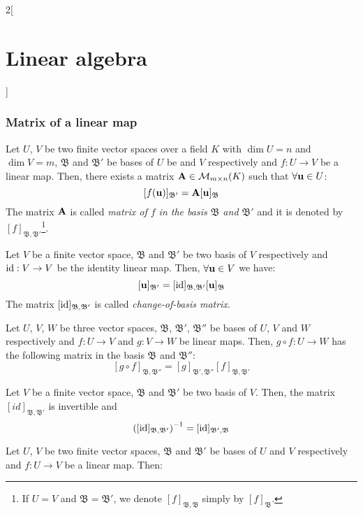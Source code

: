 \documentclass[../../../main.tex]{subfiles}
\begin{document}
\begin{multicols}{2}[\section{Linear algebra}]
  \subsubsection*{Matrix of a linear map}
  \begin{prop}
    Let $U$, $V$ be two finite vector spaces over a field $K$ with $\dim U=n$ and $\dim V=m$, $\mathfrak{B}$ and $\mathfrak{B}'$ be bases of $U$ be and $V$ respectively and $f:U\rightarrow V$ be a linear map. Then, there exists a matrix $\vb{A}\in\mathcal{M}_{m\times n}(K)$ such that $\forall\vb{u}\in U$: $$[f(\vb{u})]_{\mathfrak{B}'}=\vb{A}[\vb{u}]_\mathfrak{B}$$
    The matrix $\vb{A}$ is called \textit{matrix of $f$ in the basis $\mathfrak{B}$ and $\mathfrak{B}'$} and it is denoted by $[f]_{\mathfrak{B},\mathfrak{B}'}$\footnote{If $U=V$ and $\mathfrak{B}=\mathfrak{B}'$, we denote $[f]_{\mathfrak{B},\mathfrak{B}}$ simply by $[f]_{\mathfrak{B}}$.}.
  \end{prop}
  \begin{corollary}
    Let $V$ be a finite vector space, $\mathfrak{B}$ and $\mathfrak{B}'$ be two basis of $V$ respectively and $\mathrm{id}:V\rightarrow V$ be the identity linear map. Then, $\forall\vb{u}\in V$ we have: $$[\vb{u}]_{\mathfrak{B}'}=[\mathrm{id}]_{\mathfrak{B},\mathfrak{B}'}[\vb{u}]_\mathfrak{B}$$ The matrix $[\mathrm{id}]_{\mathfrak{B},\mathfrak{B}'}$ is called \textit{change-of-basis matrix}.
  \end{corollary}
  \begin{prop}
    Let $U$, $V$, $W$ be three vector spaces, $\mathfrak{B}$, $\mathfrak{B}'$, $\mathfrak{B}''$ be bases of $U$, $V$ and $W$ respectively and $f:U\rightarrow V$ and $g:V\rightarrow W$ be linear maps. Then, $g\circ f:U\rightarrow W$ has the following matrix in the basis $\mathfrak{B}$ and $\mathfrak{B}''$: $$[g\circ f]_{\mathfrak{B},\mathfrak{B}''}=[g]_{\mathfrak{B}',\mathfrak{B}''}[f]_{\mathfrak{B},\mathfrak{B}'}$$
  \end{prop}
  \begin{corollary}
    Let $V$ be a finite vector space, $\mathfrak{B}$ and $\mathfrak{B}'$ be two basis of $V$. Then, the matrix $[id]_{\mathfrak{B},\mathfrak{B}'}$ is invertible and $${\left([\mathrm{id}]_{\mathfrak{B},\mathfrak{B}'}\right)}^{-1}=[\mathrm{id}]_{\mathfrak{B}',\mathfrak{B}}$$
  \end{corollary}
  \begin{corollary}
    Let $U$, $V$ be two finite vector spaces, $\mathfrak{B}$ and $\mathfrak{B}'$ be bases of $U$ and $V$ respectively and $f:U\rightarrow V$ be a linear map. Then:

\end{corollary}
\end{multicols}
\end{document}
